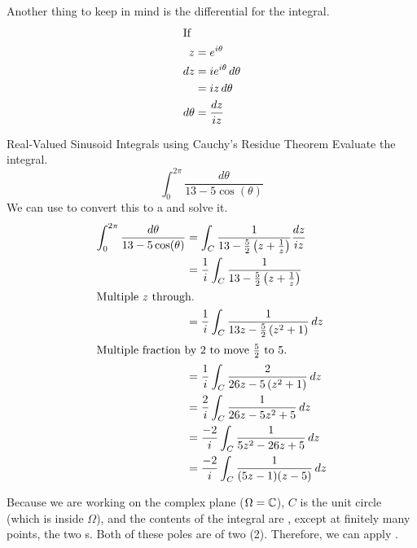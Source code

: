 Another thing to keep in mind is the differential for the integral.
\begin{align*}
  \shortintertext{If}
  z &= e^{i \theta} \\
  dz &= i e^{i \theta} \, d\theta \\
    &= i z \, d\theta \\
  d\theta &= \frac{dz}{i z}
\end{align*}

\begin{example}{Real-Valued Sinusoid Integrals using Cauchy's Residue Theorem}
  Evaluate the integral.
  \begin{equation*}
    \int_{0}^{2\pi} \frac{d\theta}{13 - 5\cos(\theta)}
  \end{equation*}
  \tcblower{}
  We can use  to convert this to a  and solve it.
  \begin{align*}
    \int_{0}^{2\pi} \frac{d\theta}{13 - 5\cos(\theta)} &= \int_{C} \frac{1}{13 - \frac{5}{2} \left( z + \frac{1}{z} \right)} \frac{dz}{i z} \\
                                                       &= \frac{1}{i} \int_{C} \frac{1}{13 - \frac{5}{2} \left( z + \frac{1}{z} \right)} \\
    \shortintertext{Multiple $z$ through.}
                                                       &= \frac{1}{i} \int_{C} \frac{1}{13z - \frac{5}{2} \left( z^{2} + 1 \right)} \, dz \\
    \shortintertext{Multiple fraction by $2$ to move $\frac{5}{2}$ to $5$.}
                                                       &= \frac{1}{i} \int_{C} \frac{2}{26z - 5 \left( z^{2} + 1 \right)} \, dz \\
                                                       &= \frac{2}{i} \int_{C} \frac{1}{26z - 5z^{2} + 5} \, dz \\
                                                       &= \frac{-2}{i} \int_{C} \frac{1}{5z^{2} - 26z + 5} \, dz \\
                                                       &= \frac{-2}{i} \int_{C} \frac{1}{(5z-1) (z-5)} \, dz
  \end{align*}

  Because we are working on the complex plane ($\Omega = \operatorname{\mathbb{C}}$), $C$ is the unit circle (which is inside $\Omega$), and the contents of the integral are , except at finitely many points, the two s.
  Both of these poles are of  two (2).
  Therefore, we can apply .


\end{example}
